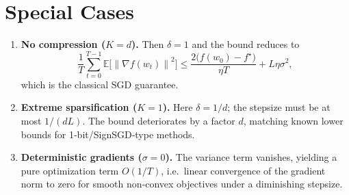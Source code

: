 \documentclass{article}
\newcommand{\E}{\mathbb{E}}
\newcommand{\norm}[1]{\left\|#1\right\|}
\begin{document}
\section*{Special Cases}
\begin{enumerate}[label=\alph*)]
\item \textbf{No compression ($K=d$).} Then $\delta=1$ and the bound reduces to
\[
\frac{1}{T}\sum_{t=0}^{T-1}\E\!\bigl[\norm{\nabla f(w_t)}^2\bigr]
\le
\frac{2\bigl(f(w_0)-f^\star\bigr)}{\eta T}
   + L\eta\sigma^2 ,
\]
which is the classical SGD guarantee.
\item \textbf{Extreme sparsification ($K=1$).} Here $\delta=1/d$; the stepsize must be at most $1/(dL)$. The bound deteriorates by a factor $d$, matching known lower bounds for 1‑bit/SignSGD‑type methods.
\item \textbf{Deterministic gradients ($\sigma=0$).} The variance term vanishes, yielding a pure optimization term $O(1/T)$, i.e.\ linear convergence of the gradient norm to zero for smooth non‑convex objectives under a diminishing stepsize.
\end{enumerate}
\end{document}
